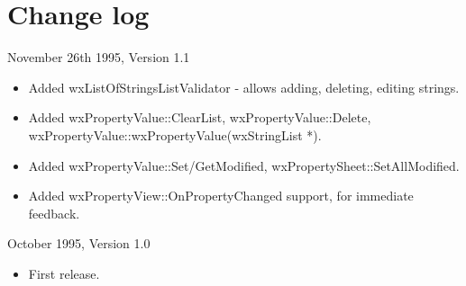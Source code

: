 \chapter{Change log}\label{changes}
%
%
\setfooter{\thepage}{}{}{}{}{\thepage}%

November 26th 1995, Version 1.1

\begin{itemize}\itemsep=0pt
\item Added wxListOfStringsListValidator - allows adding, deleting, editing
strings.
\item Added wxPropertyValue::ClearList, wxPropertyValue::Delete,
wxPropertyValue::wxPropertyValue(wxStringList *).
\item Added wxPropertyValue::Set/GetModified, wxPropertySheet::SetAllModified.
\item Added wxPropertyView::OnPropertyChanged support, for immediate feedback.
\end{itemize}

October 1995, Version 1.0

\begin{itemize}\itemsep=0pt
\item First release.
\end{itemize}

